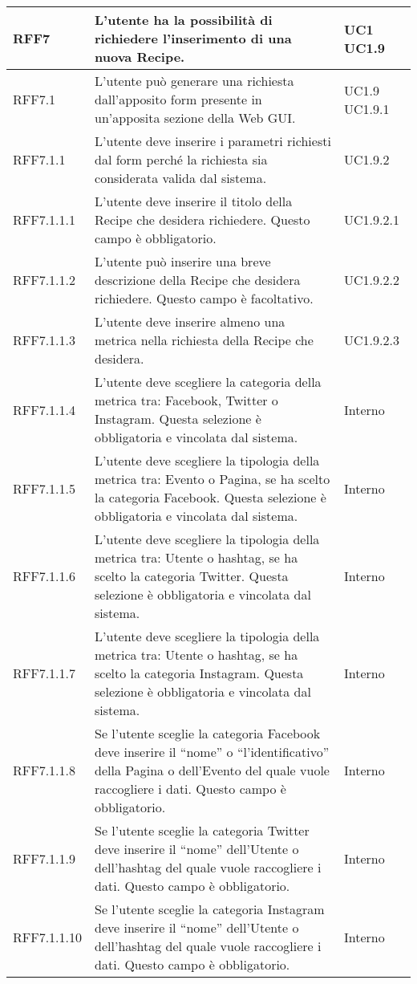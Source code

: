 \begin{center}
\begin{longtable}{| p{2.5cm} | p{8cm} | p{2cm} |}
		RFF7  & L'utente ha la possibilità di richiedere l'inserimento di una nuova Recipe. & UC1 \newline UC1.9 \\
		\hline
		RFF7.1  & L'utente può generare una richiesta dall'apposito form presente in un'apposita sezione della Web GUI. & UC1.9 \newline UC1.9.1 \\
		\hline
		RFF7.1.1 & L'utente deve inserire i parametri richiesti dal form perché la richiesta sia considerata valida dal sistema. & UC1.9.2  \\
		\hline
		RFF7.1.1.1 & L'utente deve inserire il titolo della Recipe che desidera richiedere. Questo campo è obbligatorio. & UC1.9.2.1 \\
		\hline
		RFF7.1.1.2 & L'utente può inserire una breve descrizione della Recipe che desidera richiedere. Questo campo è facoltativo. & UC1.9.2.2 \\
		\hline
		RFF7.1.1.3 & L'utente deve inserire almeno una metrica nella richiesta della Recipe che desidera. & UC1.9.2.3 \\
		\hline
		RFF7.1.1.4 & L'utente deve scegliere la categoria della metrica tra: Facebook, Twitter o Instagram. Questa selezione è obbligatoria e vincolata dal sistema. & Interno \\
		\hline
		RFF7.1.1.5 & L'utente deve scegliere la tipologia della metrica tra: Evento o Pagina, se ha scelto la categoria Facebook. Questa selezione è obbligatoria e vincolata dal sistema. & Interno \\
		\hline
		RFF7.1.1.6 & L'utente deve scegliere la tipologia della metrica tra: Utente o hashtag, se ha scelto la categoria Twitter. Questa selezione è obbligatoria e vincolata dal sistema. & Interno \\
		\hline
		RFF7.1.1.7 & L'utente deve scegliere la tipologia della metrica tra: Utente o hashtag, se ha scelto la categoria Instagram. Questa selezione è obbligatoria e vincolata dal sistema. & Interno \\
		\hline
		RFF7.1.1.8 & Se l'utente sceglie la categoria Facebook deve inserire il ``nome'' o ``l'identificativo'' della Pagina o dell'Evento del quale vuole raccogliere i dati. Questo campo è obbligatorio. & Interno \\
		\hline
		RFF7.1.1.9 & Se l'utente sceglie la categoria Twitter deve inserire il ``nome'' dell'Utente o dell'hashtag del quale vuole raccogliere i dati. Questo campo è obbligatorio. & Interno \\
		\hline
		RFF7.1.1.10 & Se l'utente sceglie la categoria Instagram deve inserire il ``nome'' dell'Utente o dell'hashtag del quale vuole raccogliere i dati. Questo campo è obbligatorio. & Interno \\

\end{longtable}
\end{center}

